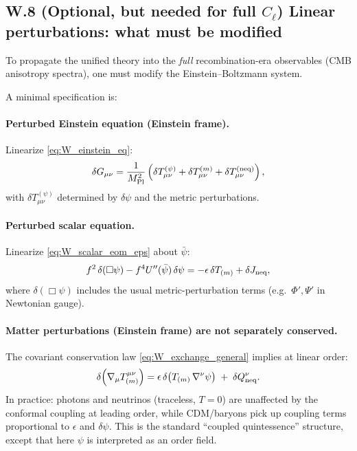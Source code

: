 \documentclass[10pt]{article}
\begin{document}
\subsection{W.8 (Optional, but needed for full $C_\ell$) Linear perturbations: what must be modified}
\label{app:early_universe:perturbations}

To propagate the unified theory into the \emph{full} recombination-era observables (CMB anisotropy spectra),
one must modify the Einstein--Boltzmann system.

A minimal specification is:

\paragraph{Perturbed Einstein equation (Einstein frame).}
Linearize \eqref{eq:W_einstein_eq}:
\begin{equation}
\delta G_{\mu\nu}
=
\frac{1}{M_{\rm Pl}^2}\left(
\delta T^{(\psi)}_{\mu\nu}
+
\delta T^{(m)}_{\mu\nu}
+
\delta T^{(\rm neq)}_{\mu\nu}
\right),
\label{eq:W_lin_einstein}
\end{equation}
with $\delta T^{(\psi)}_{\mu\nu}$ determined by $\delta\psi$ and the metric perturbations.

\paragraph{Perturbed scalar equation.}
Linearize \eqref{eq:W_scalar_eom_eps} about $\bar\psi$:
\begin{equation}
f^2\,\delta(\Box\psi) - f^4U''(\bar\psi)\,\delta\psi
=
-\epsilon\,\delta T_{(m)} + \delta J_{\rm neq},
\label{eq:W_lin_scalar}
\end{equation}
where $\delta(\Box\psi)$ includes the usual metric-perturbation terms (e.g.\ $\Phi',\Psi'$ in Newtonian gauge).

\paragraph{Matter perturbations (Einstein frame) are not separately conserved.}
The covariant conservation law \eqref{eq:W_exchange_general} implies at linear order:
\begin{equation}
\delta\!\left(\nabla_\mu T_{(m)}^{\mu\nu}\right)
=
\epsilon\,
\delta\!\left(T_{(m)}\,\nabla^\nu\psi\right)
\;+\;\delta Q^\nu_{\rm neq}.
\label{eq:W_lin_exchange}
\end{equation}
In practice: photons and neutrinos (traceless, $T=0$) are unaffected by the conformal coupling at leading order,
while CDM/baryons pick up coupling terms proportional to $\epsilon$ and $\delta\psi$.
This is the standard ``coupled quintessence'' structure, except that here $\psi$ is interpreted as an order field.
\end{document}
